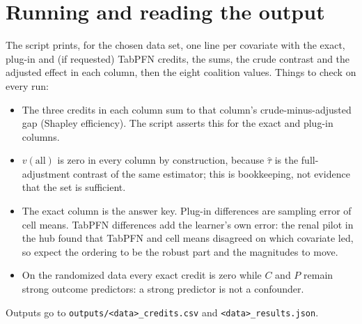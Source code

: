 \documentclass[10pt,letterpaper]{article}
\begin{document}
\section{Running and reading the output}
The script prints, for the chosen data set, one line per covariate with the exact, plug-in and (if requested) TabPFN credits, the sums, the crude contrast and the adjusted effect in each column, then the eight coalition values. Things to check on every run:
\begin{itemize}\setlength{\itemsep}{1pt}
\item The three credits in each column sum to that column's crude-minus-adjusted gap (Shapley efficiency). The script asserts this for the exact and plug-in columns.
\item $v(\text{all})$ is zero in every column by construction, because $\hat\tau$ is the full-adjustment contrast of the same estimator; this is bookkeeping, not evidence that the set is sufficient.
\item The exact column is the answer key. Plug-in differences are sampling error of cell means. TabPFN differences add the learner's own error: the renal pilot in the hub found that TabPFN and cell means disagreed on which covariate led, so expect the ordering to be the robust part and the magnitudes to move.
\item On the randomized data every exact credit is zero while $C$ and $P$ remain strong outcome predictors: a strong predictor is not a confounder.
\end{itemize}
Outputs go to \texttt{outputs/<data>\_credits.csv} and \texttt{<data>\_results.json}.

\newpage
\end{document}
